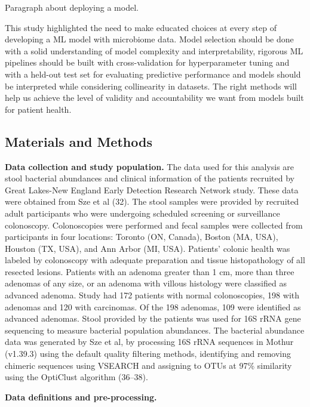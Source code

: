 \documentclass[11pt,]{article}
\begin{document}
Paragraph about deploying a model.

This study highlighted the need to make educated choices at every step
of developing a ML model with microbiome data. Model selection should be
done with a solid understanding of model complexity and
interpretability, rigorous ML pipelines should be built with
cross-validation for hyperparameter tuning and with a held-out test set
for evaluating predictive performance and models should be interpreted
while considering collinearity in datasets. The right methods will help
us achieve the level of validity and accountability we want from models
built for patient health.

\subsection{Materials and Methods}\label{materials-and-methods}

\textbf{Data collection and study population.} The data used for this
analysis are stool bacterial abundances and clinical information of the
patients recruited by Great Lakes-New England Early Detection Research
Network study. These data were obtained from Sze et al (32). The stool
samples were provided by recruited adult participants who were
undergoing scheduled screening or surveillance colonoscopy.
Colonoscopies were performed and fecal samples were collected from
participants in four locations: Toronto (ON, Canada), Boston (MA, USA),
Houston (TX, USA), and Ann Arbor (MI, USA). Patients' colonic health was
labeled by colonoscopy with adequate preparation and tissue
histopathology of all resected lesions. Patients with an adenoma greater
than 1 cm, more than three adenomas of any size, or an adenoma with
villous histology were classified as advanced adenoma. Study had 172
patients with normal colonoscopies, 198 with adenomas and 120 with
carcinomas. Of the 198 adenomas, 109 were identified as advanced
adenomas. Stool provided by the patients was used for 16S rRNA gene
sequencing to measure bacterial population abundances. The bacterial
abundance data was generated by Sze et al, by processing 16S rRNA
sequences in Mothur (v1.39.3) using the default quality filtering
methods, identifying and removing chimeric sequences using VSEARCH and
assigning to OTUs at 97\% similarity using the OptiClust algorithm
(36--38).

\textbf{Data definitions and pre-processing.}
\end{document}
